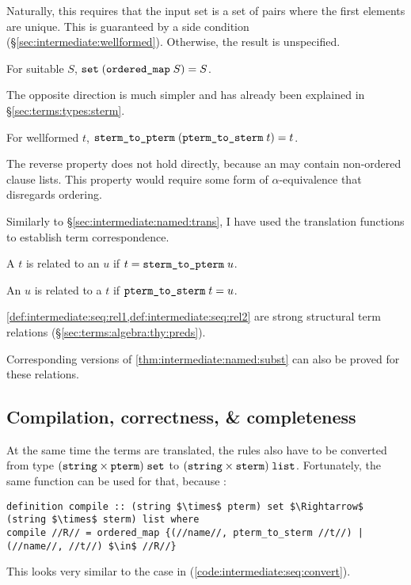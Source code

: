 Naturally, this requires that the input set is a set of pairs where the first elements are unique.
This is guaranteed by a side condition (§\ref{sec:intermediate:wellformed}).
Otherwise, the result is unspecified.
%
\begin{lemma}
  For suitable $S$, $\texttt{\textup{set}}\;(\texttt{\textup{ordered\_map}}\;S) = S$.
\end{lemma}
%
\noindent
The opposite direction is much simpler and has already been explained in §\ref{sec:terms:types:sterm}.
%
\begin{corollary}
  For wellformed $t$, $\texttt{\textup{sterm\_to\_pterm}}\;(\texttt{\textup{pterm\_to\_sterm}}\;t) = t$.
\end{corollary}
%
\noindent
The reverse property does not hold directly, because an  may contain non-ordered clause lists.
This property would require some form of $\alpha$-equivalence that disregards ordering.

Similarly to §\ref{sec:intermediate:named:trans}, I have used the translation functions to establish term correspondence.

\begin{definition}\label{def:intermediate:seq:rel1}
  A  $t$ is related to an  $u$ if $t = \texttt{\textup{sterm\_to\_pterm}}\;u$.
\end{definition}

\begin{definition}\label{def:intermediate:seq:rel2}
  An  $u$ is related to a  $t$ if $\texttt{\textup{pterm\_to\_sterm}}\;t = u$.
\end{definition}

\begin{corollary}
  \cref{def:intermediate:seq:rel1,def:intermediate:seq:rel2} are strong structural term relations (§\ref{sec:terms:algebra:thy:preds}).
\end{corollary}

\noindent
Corresponding versions of \cref{thm:intermediate:named:subst} can also be proved for these relations.

\subsection{Compilation, correctness, \& completeness}

At the same time the terms are translated, the rules also have to be converted from type $(\texttt{\textup{string}}\times \texttt{\textup{pterm}})\;\texttt{\textup{set}}$ to $(\texttt{\textup{string}}\times \texttt{\textup{sterm}})\;\texttt{\textup{list}}$.
Fortunately, the same  function can be used for that, because :
%
\begin{lstlisting}[language=Isabelle]
definition compile :: (string $\times$ pterm) set $\Rightarrow$ (string $\times$ sterm) list where
compile //R// = ordered_map {(//name//, pterm_to_sterm //t//) | (//name//, //t//) $\in$ //R//}
\end{lstlisting}
%
\noindent
This looks very similar to the  case in  (\cref{code:intermediate:seq:convert}).

